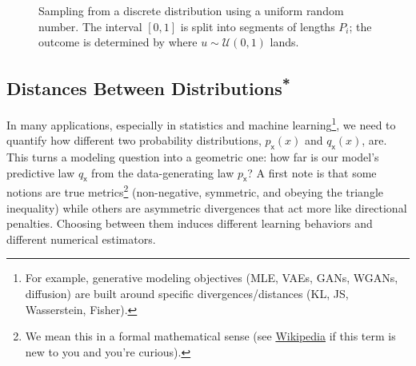 \begin{figure}[h!]
    \centering
    \caption{Sampling from a discrete distribution using a uniform random number. The interval $[0,1]$ is split into segments of lengths $P_i$; the outcome is determined by where $u\sim\mathcal U(0,1)$ lands.}
    \label{fig:discrete-sampling}
\end{figure}

\subsection{\texorpdfstring{Distances Between Distributions\textsuperscript{*}}{Distances Between Distributions}}
In many applications, especially in statistics and machine learning\footnote{For example, generative modeling objectives (MLE, VAEs, GANs, WGANs, diffusion) are built around specific divergences/distances (KL, JS, Wasserstein, Fisher).}, we need to quantify how different two probability distributions, $p_{\mathsf{x}}(x)$ and $q_{\mathsf{x}}(x)$, are. This turns a modeling question into a geometric one: how far is our model's predictive law $q_{\mathsf{x}}$ from the data-generating law $p_{\mathsf{x}}$? A first note is that some notions are true metrics\footnote{We mean this in a formal mathematical sense (see \href{https://en.wikipedia.org/wiki/Metric_(mathematics)}{Wikipedia} if this term is new to you and you're curious).} (non-negative, symmetric, and obeying the triangle inequality) while others are asymmetric divergences that act more like directional penalties. Choosing between them induces different learning behaviors and different numerical estimators.


